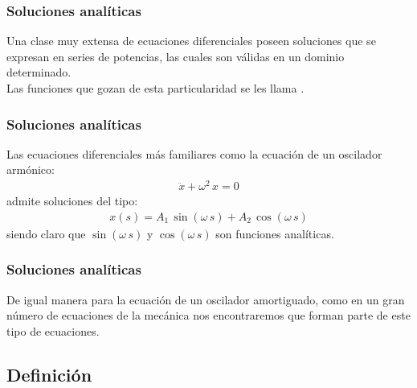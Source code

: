 \documentclass[12pt]{beamer}
\begin{document}
\begin{frame}
\frametitle{Soluciones analíticas}
Una clase muy extensa de ecuaciones diferenciales poseen soluciones que se expresan en series de potencias, las cuales son válidas en un dominio determinado.
\\
\bigskip
\pause
Las funciones que gozan de esta particularidad se les llama .
\end{frame}
\begin{frame}
\frametitle{Soluciones analíticas}
Las ecuaciones diferenciales más familiares como la ecuación de un oscilador armónico:
\pause
\begin{align*}
\ddot{x} + \omega^{2} \, x = 0
\end{align*}
\pause
admite soluciones del tipo:
\begin{align*}
x (s) = A_{1} \, \sin( \omega \, s) + A_{2} \, \cos (\omega \, s)
\end{align*}
siendo claro que $\sin( \omega \, s)$ y $\cos( \omega \, s)$ son funciones analíticas.
\end{frame}
\begin{frame}
\frametitle{Soluciones analíticas}
De igual manera para la ecuación de un oscilador amortiguado, como en un gran número de ecuaciones de la mecánica nos encontraremos que forman parte de este tipo de ecuaciones.
\end{frame}

\subsection{Definición}
\end{document}
